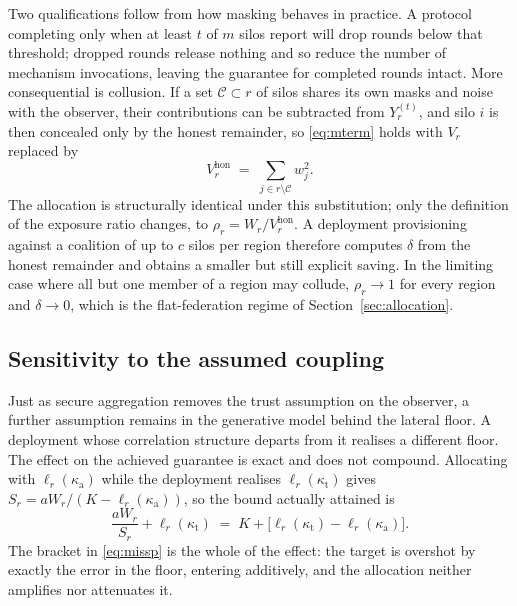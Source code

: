 \documentclass[acmsmall,screen,review,anonymous]{acmart}
\theoremstyle{acmdefinition}%
\begin{document}
Two qualifications follow from how masking behaves in practice. A protocol
completing only when at least $t$ of $m$ silos report will drop rounds below that
threshold; dropped rounds release nothing and so reduce the number of mechanism
invocations, leaving the guarantee for completed rounds intact. More consequential
is collusion. If a set $\mathcal{C} \subset r$ of silos shares its own masks and
noise with the observer, their contributions can be subtracted from $Y_r^{(t)}$,
and silo $i$ is then concealed only by the honest remainder, so \eqref{eq:mterm}
holds with $V_r$ replaced by
\begin{equation}
V_r^{\mathrm{hon}} \;=\; \textstyle\sum_{j \in r \setminus \mathcal{C}} w_j^2 .
\end{equation}
The allocation is structurally identical under this substitution; only the
definition of the exposure ratio changes, to
$\rho_r = W_r / V_r^{\mathrm{hon}}$. A deployment provisioning against a coalition
of up to $c$ silos per region therefore computes $\delta$ from the honest
remainder and obtains a smaller but still explicit saving. In the limiting case
where all but one member of a region may collude, $\rho_r \to 1$ for every region
and $\delta \to 0$, which is the flat-federation regime of
Section~\ref{sec:allocation}.

\subsection{Sensitivity to the assumed coupling}

Just as secure aggregation removes the trust assumption on the observer, a
further assumption remains in the generative model behind the lateral floor. A
deployment whose correlation structure departs from it realises a different
floor. The effect on the achieved guarantee is exact and does not compound.
Allocating with $\ell_r(\kappa_{\mathrm{a}})$ while the deployment realises
$\ell_r(\kappa_{\mathrm{t}})$ gives $S_r = aW_r/(K - \ell_r(\kappa_{\mathrm{a}}))$,
so the bound actually attained is
\begin{equation}
\frac{aW_r}{S_r} + \ell_r(\kappa_{\mathrm{t}})
\;=\; K + \big[\ell_r(\kappa_{\mathrm{t}}) - \ell_r(\kappa_{\mathrm{a}})\big].
\label{eq:missp}
\end{equation}
The bracket in \eqref{eq:missp} is the whole of the effect: the target is
overshot by exactly the error in the floor, entering additively, and the
allocation neither amplifies nor attenuates it.
\end{document}
